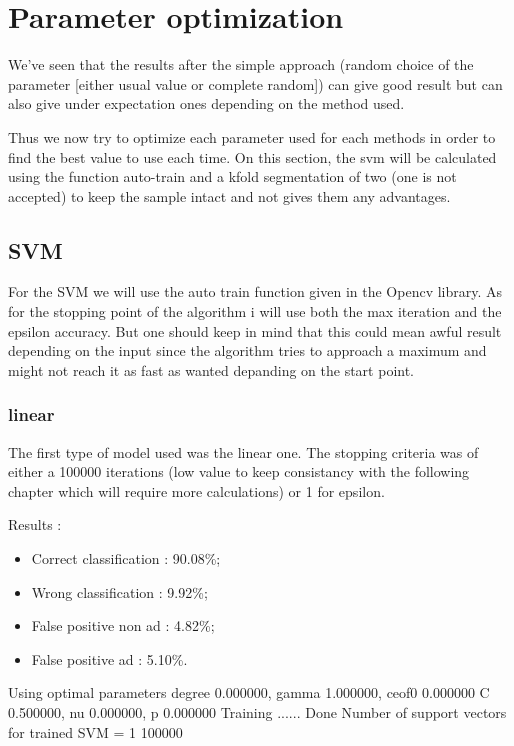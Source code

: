 \chapter{Parameter optimization}

We've seen that the results after the simple approach (random choice of the parameter [either usual value or complete random]) can give good result but can also give under expectation ones depending on the method used.

Thus we now try to optimize each parameter used for each methods in order to find the best value to use each time. On this section, the svm will be calculated using the function auto-train and a kfold segmentation of two (one is not accepted) to keep the sample intact and not gives them any advantages.

\section{SVM}

For the SVM we will use the auto train function given in the Opencv library. As for the stopping point of the algorithm i will use both the max iteration and the epsilon accuracy. But one should keep in mind that this could mean awful result depending on the input since the algorithm tries to approach a maximum and might not reach it as fast as wanted depanding on the start point.

\subsection{linear}

The first type of model used was the linear one. The stopping criteria was of either a 100000 iterations (low value to keep consistancy with the following chapter which will require more calculations) or 1 for epsilon.

Results :
\begin{itemize}
  \item Correct classification : 90.08\%;
  \item Wrong classification : 9.92\%;
  \item False positive non ad : 4.82\%;
  \item False positive ad : 5.10\%.
\end{itemize}
Using optimal parameters degree 0.000000, gamma 1.000000, ceof0 0.000000
	 C 0.500000, nu 0.000000, p 0.000000
 Training ...... Done
Number of support vectors for trained SVM = 1
100000

